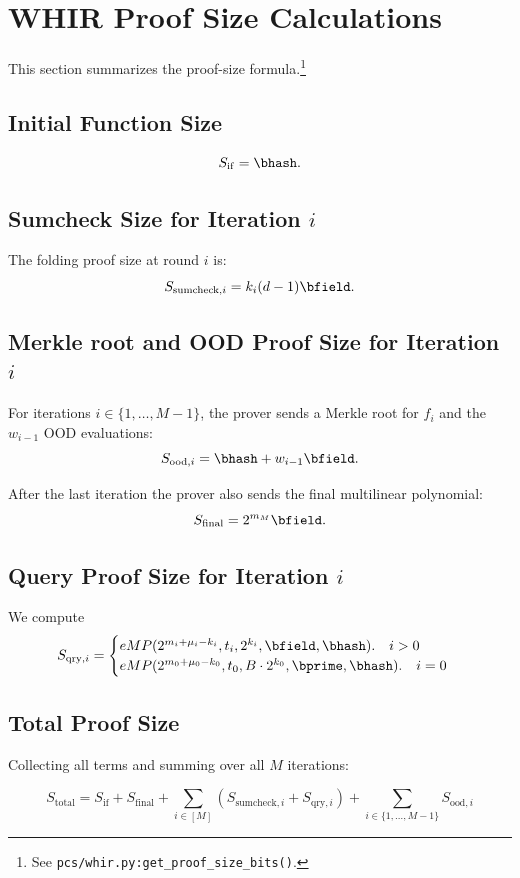\section{WHIR Proof Size Calculations}

This section summarizes the proof-size formula.\footnote{See \texttt{pcs/whir.py:get\_proof\_size\_bits()}.}

\subsection{Initial Function  Size}
\[
  S_{\mathrm{if}} = \bhash.
\]

\subsection{Sumcheck Size for Iteration \texorpdfstring{\(i\)}{i}}


The folding proof size at round $i$ is:
\[
  S_{\mathrm{sumcheck},i} = k_i(d-1)\bfield.
\]

\subsection{Merkle root and OOD Proof Size for Iteration \texorpdfstring{\(i\)}{i}}

For iterations \(i\in\{1,\ldots,M-1\}\), the prover sends a Merkle root for $f_i$ and the $w_{i-1}$ OOD evaluations:
\[
  S_{\mathrm{ood},i}
    = \bhash+w_{i-1}\bfield.
\]

After the last iteration the prover also sends the final multilinear polynomial:
$$
S_{\mathrm{final}}=2^{m_M}\bfield.
$$

\subsection{Query Proof Size for Iteration \texorpdfstring{\(i\)}{i}}


We compute
\[
  S_{\mathrm{qry},i}
    =\begin{cases}  eMP(2^{m_i+\mu_i-k_i},t_i,2^{k_i},\bfield,\bhash).\quad i>0\\
     eMP(2^{m_0+\mu_0-k_0},t_0, B\cdot 2^{k_0},\bprime,\bhash).\quad i=0
    \end{cases}
\]


\subsection{Total Proof Size}

Collecting all terms and summing over all \(M\) iterations:

\[
\boxed{
S_{\mathrm{total}}
  = S_{\mathrm{if}} + S_{\mathrm{final}}
    + \sum_{i\in[M]} \left( S_{\mathrm{sumcheck},i} + S_{\mathrm{qry},i} \right)
    + \sum_{i\in\{1,\ldots,M-1\}} S_{\mathrm{ood},i}
}
\]

